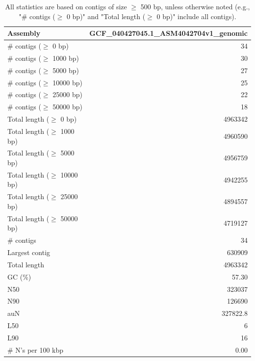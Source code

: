 \documentclass[12pt,a4paper]{article}
\begin{document}
\begin{table}[ht]
\begin{center}
\caption{All statistics are based on contigs of size $\geq$ 500 bp, unless otherwise noted (e.g., "\# contigs ($\geq$ 0 bp)" and "Total length ($\geq$ 0 bp)" include all contigs).}
\begin{tabular}{|l*{1}{|r}|}
\hline
Assembly & GCF\_040427045.1\_ASM4042704v1\_genomic \\ \hline
\# contigs ($\geq$ 0 bp) & 34 \\ \hline
\# contigs ($\geq$ 1000 bp) & 30 \\ \hline
\# contigs ($\geq$ 5000 bp) & 27 \\ \hline
\# contigs ($\geq$ 10000 bp) & 25 \\ \hline
\# contigs ($\geq$ 25000 bp) & 22 \\ \hline
\# contigs ($\geq$ 50000 bp) & 18 \\ \hline
Total length ($\geq$ 0 bp) & 4963342 \\ \hline
Total length ($\geq$ 1000 bp) & 4960590 \\ \hline
Total length ($\geq$ 5000 bp) & 4956759 \\ \hline
Total length ($\geq$ 10000 bp) & 4942255 \\ \hline
Total length ($\geq$ 25000 bp) & 4894557 \\ \hline
Total length ($\geq$ 50000 bp) & 4719127 \\ \hline
\# contigs & 34 \\ \hline
Largest contig & 630909 \\ \hline
Total length & 4963342 \\ \hline
GC (\%) & 57.30 \\ \hline
N50 & 323037 \\ \hline
N90 & 126690 \\ \hline
auN & 327822.8 \\ \hline
L50 & 6 \\ \hline
L90 & 16 \\ \hline
\# N's per 100 kbp & 0.00 \\ \hline
\end{tabular}
\end{center}
\end{table}
\end{document}
